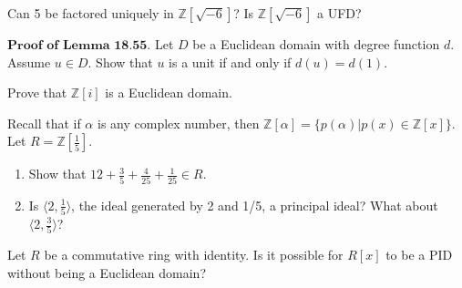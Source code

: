 \documentclass[12pt,letterpaper,boxed]{hmcpset}
\begin{document}


\begin{problem}[18.3.9]
Can 5 be factored uniquely in $\mathbb{Z}[\sqrt{-6}]$? Is $\mathbb{Z}[\sqrt{-6}]$ a UFD?
\end{problem}

\begin{solution}
\end{solution}

\clearpage

\begin{problem}[18.4.1]
$\textbf{Proof of Lemma 18.55.}$ Let $D$ be a Euclidean domain with degree function $d$. Assume $u \in D$. Show that $u$ is a unit if and only if $d(u) = d(1)$.
\end{problem}

\begin{solution}
\end{solution}

\clearpage

\begin{problem}[18.4.7]
Prove that $\mathbb{Z}[i]$ is a Euclidean domain.
\end{problem}

\begin{solution}
\end{solution}

\clearpage

\begin{problem}[19.1.3]
Recall that if $\alpha$ is any complex number, then $\mathbb{Z}[\alpha] = \{p(\alpha) \vert p(x) \in \mathbb{Z}[x] \}$. Let $R = \mathbb{Z}[\frac{1}{5}]$.
\begin{enumerate}[label=\alph*]
\item Show that $12 + \frac{3}{5} + \frac{4}{25} + \frac {1}{25} \in R$.
\item Is $\langle 2,\frac{1}{5} \rangle$, the ideal generated by 2 and 1/5, a principal ideal?  What about $\langle 2, \frac{3}{5} \rangle$?
\end{enumerate}
\end{problem}

\begin{solution}
\end{solution}

\clearpage

\begin{problem}[19.2.7]
Let $R$ be a commutative ring with identity. Is it possible for $R[x]$ to be a PID without being a Euclidean domain?
\end{problem}

\begin{solution}
\end{solution}
\end{document}
